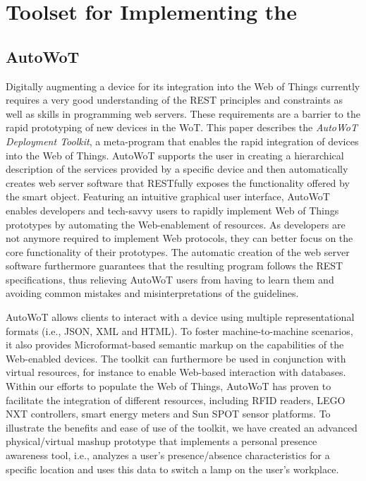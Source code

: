 \section{Toolset for Implementing the \WoT{}}

\subsection{AutoWoT}
Digitally augmenting a device for its integration into the Web of Things currently requires a very good understanding of the REST principles and constraints as well as skills in programming web servers. These requirements are a barrier to the rapid prototyping of new devices in the WoT. This paper describes the \emph{AutoWoT Deployment Toolkit}, a meta-program that enables the rapid integration of devices into the Web of Things. AutoWoT supports the user in creating a hierarchical description of the services provided by a specific device and then automatically creates web server software that RESTfully exposes the functionality offered by the smart object. Featuring an intuitive graphical user interface, AutoWoT enables developers and tech-savvy users to rapidly implement Web of Things prototypes by automating the Web-enablement of resources. As developers are not anymore required to implement Web protocols, they can better focus on the core functionality of their prototypes. The automatic creation of the web server software furthermore guarantees that the resulting program follows the REST specifications, thus relieving AutoWoT users from having to learn them and avoiding common mistakes and misinterpretations of the guidelines.

AutoWoT allows clients to interact with a device using multiple representational formats (i.e., JSON, XML and HTML). To foster machine-to-machine scenarios, it also provides Microformat-based semantic markup on the capabilities of the Web-enabled devices. The toolkit can furthermore be used in conjunction with virtual resources, for instance to enable Web-based interaction with databases. Within our efforts to populate the Web of Things, AutoWoT has proven to facilitate the integration of different resources, including RFID readers, LEGO NXT controllers, smart energy meters and Sun SPOT sensor platforms. To illustrate the benefits and ease of use of the toolkit, we have created an advanced physical/virtual mashup prototype that implements a personal presence awareness tool, i.e., analyzes a user's presence/absence characteristics for a specific location and uses this data to switch a lamp on the user's workplace.

